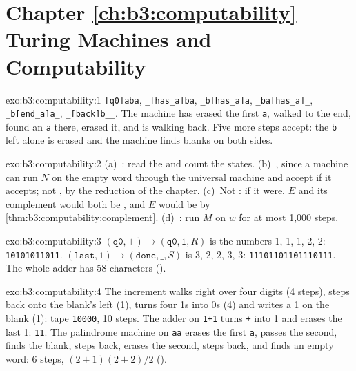 \section*{Chapter \ref{ch:b3:computability} --- Turing Machines and Computability}

\begin{solution}{exo:b3:computability:1}
\texttt{[q0]aba}, \texttt{\_[has\_a]ba}, \texttt{\_b[has\_a]a}, \texttt{\_ba[has\_a]\_}, \texttt{\_b[end\_a]a\_}, \texttt{\_[back]b\_\_}. The machine has erased the first \texttt{a}, walked to the end, found an \texttt{a} there, erased it, and is walking back. Five more steps accept: the \texttt{b} left alone is erased and the machine finds blanks on both sides.
\end{solution}

\begin{solution}{exo:b3:computability:2}
(a)~: read the  and count the states. (b)~, since a machine can run $N$ on the empty word through the universal machine and accept if it accepts; not , by the reduction of the chapter. (c)~Not : if it were, $E$ and its complement would both be , and $E$ would be  by \cref{thm:b3:computability:complement}. (d)~: run $M$ on $w$ for at most 1,000 steps.
\end{solution}

\begin{solution}{exo:b3:computability:3}
$(\mathtt{q0}, \mathtt{+}) \to (\mathtt{q0}, \mathtt{1}, R)$ is the numbers 1, 1, 1, 2, 2: \texttt{10101011011}. $(\mathtt{last}, \mathtt{1}) \to (\mathtt{done}, \mathtt{\_}, S)$ is 3, 2, 2, 3, 3: \texttt{11101101101110111}. The whole adder has 58 characters ().
\end{solution}

\begin{solution}{exo:b3:computability:4}
The increment walks right over four digits (4 steps), steps back onto the blank's left (1), turns four 1s into 0s (4) and writes a 1 on the blank (1): tape \texttt{10000}, 10 steps. The adder on \texttt{1+1} turns \texttt{+} into 1 and erases the last 1: \texttt{11}. The palindrome machine on \texttt{aa} erases the first \texttt{a}, passes the second, finds the blank, steps back, erases the second, steps back, and finds an empty word: 6 steps, $(2 + 1)(2 + 2)/2$ ().
\end{solution}

